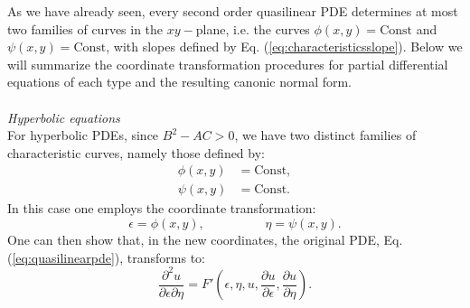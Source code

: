 As we have already seen, every second order quasilinear PDE determines at most two families of curves in the $xy-$plane, i.e. the curves $\phi(x,y) = \text{Const}$ and $\psi(x,y) = \text{Const}$, with slopes defined by Eq. (\ref{eq:characteristicsslope}). Below we will summarize the coordinate transformation procedures for partial differential equations of each type and the resulting canonic normal form.\\\\
\emph{Hyperbolic equations}\\
For hyperbolic PDEs, since $B^2-AC > 0$, we have two distinct families of characteristic curves, namely those defined by:
\begin{align*}
  \phi(x,y) &= \text{Const}, \\
  \psi(x,y) &= \text{Const}. 
\end{align*}
In this case one employs the coordinate transformation:
\begin{equation*}
  \epsilon =  \phi(x,y), \hspace{2cm}  \eta = \psi(x,y).
\end{equation*}
One can then show that, in the new coordinates,  the original PDE, Eq. (\ref{eq:quasilinearpde}), transforms to:
\begin{equation*}
  \frac{\partial^2 u}{\partial \epsilon \partial \eta} = F'(\epsilon,\eta,u,\frac{\partial u}{\partial \epsilon},\frac{\partial u}{\partial \eta}).
\end{equation*}

